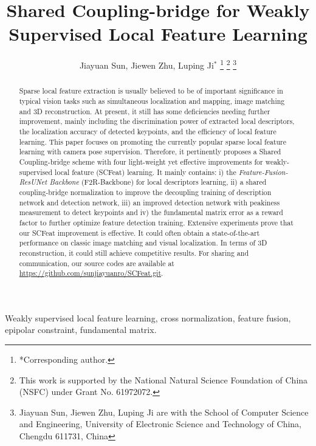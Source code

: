 \documentclass[journal]{IEEEtran}
\begin{document}
\title{Shared Coupling-bridge for Weakly Supervised Local Feature Learning}


\author{Jiayuan Sun, Jiewen Zhu, Luping Ji$^{\ast}$
\thanks{*Corresponding author.}
\thanks{This work is supported by the National Natural Science Foundation of China (NSFC) under Grant No.
61972072.}
\thanks{Jiayuan Sun, Jiewen Zhu, Luping Ji are with the School of Computer
Science and Engineering, University of Electronic Science and Technology
of China, Chengdu 611731, China}
}

\maketitle

\begin{abstract}
Sparse local feature extraction is usually believed to be of important significance in typical vision tasks such as simultaneous localization and mapping, image matching and 3D reconstruction. 
At present, it still has some deficiencies needing further improvement, mainly including the discrimination power of extracted local descriptors, the localization accuracy of detected keypoints, and the efficiency of local feature learning.
This paper focuses on promoting the currently popular sparse local feature learning with camera pose supervision. 
Therefore, it pertinently proposes a Shared Coupling-bridge scheme with four light-weight yet effective improvements for weakly-supervised local feature (SCFeat) learning. 
It mainly contains: 
i) the \emph{Feature-Fusion-ResUNet Backbone} (F2R-Backbone) for local descriptors learning, 
ii) a shared coupling-bridge normalization to improve the decoupling training of description network and detection network,
iii) an improved detection network with peakiness measurement to detect keypoints and 
iv) the fundamental matrix error as a reward factor to further optimize feature detection training. 
Extensive experiments prove that our SCFeat improvement is effective. 
It could often obtain a state-of-the-art performance on classic image matching and visual localization. In terms of 3D reconstruction, it could still achieve competitive results. For sharing and communication, our source codes are available at \href{https://github.com/sunjiayuanro/SCFeat.git}{https://github.com/sunjiayuanro/SCFeat.git}.
\end{abstract}

\begin{IEEEkeywords}
Weakly supervised local feature learning, cross normalization, feature fusion, epipolar constraint, fundamental matrix.
\end{IEEEkeywords}
\end{document}
